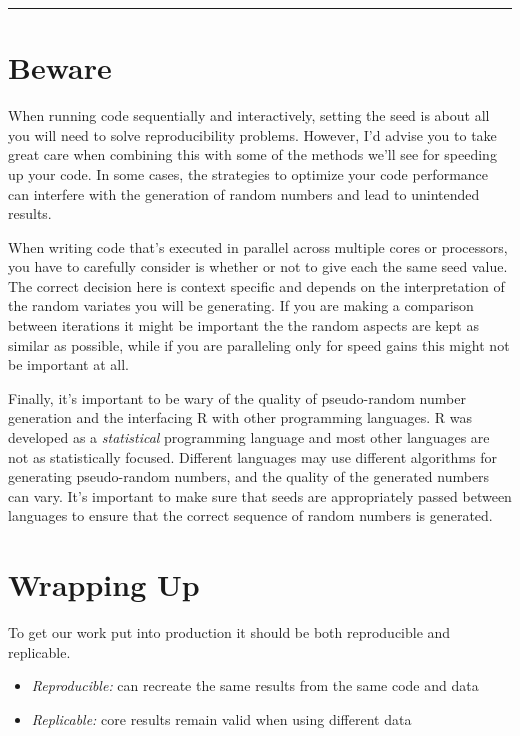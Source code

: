 \documentclass[
  letterpaper,
  DIV=11,
  numbers=noendperiod]{scrreprt}
\begin{document}
\begin{center}\rule{0.5\linewidth}{0.5pt}\end{center}

\section{Beware}\label{beware}

When running code sequentially and interactively, setting the seed is
about all you will need to solve reproducibility problems. However, I'd
advise you to take great care when combining this with some of the
methods we'll see for speeding up your code. In some cases, the
strategies to optimize your code performance can interfere with the
generation of random numbers and lead to unintended results.

When writing code that's executed in parallel across multiple cores or
processors, you have to carefully consider is whether or not to give
each the same seed value. The correct decision here is context specific
and depends on the interpretation of the random variates you will be
generating. If you are making a comparison between iterations it might
be important the the random aspects are kept as similar as possible,
while if you are paralleling only for speed gains this might not be
important at all.

Finally, it's important to be wary of the quality of pseudo-random
number generation and the interfacing R with other programming
languages. R was developed as a \emph{statistical} programming language
and most other languages are not as statistically focused. Different
languages may use different algorithms for generating pseudo-random
numbers, and the quality of the generated numbers can vary. It's
important to make sure that seeds are appropriately passed between
languages to ensure that the correct sequence of random numbers is
generated.

\section{Wrapping Up}\label{wrapping-up-5}

To get our work put into production it should be both reproducible and
replicable.

\begin{itemize}
\item
  \emph{Reproducible:} can recreate the same results from the same code
  and data
\item
  \emph{Replicable:} core results remain valid when using different data
\end{itemize}
\end{document}
